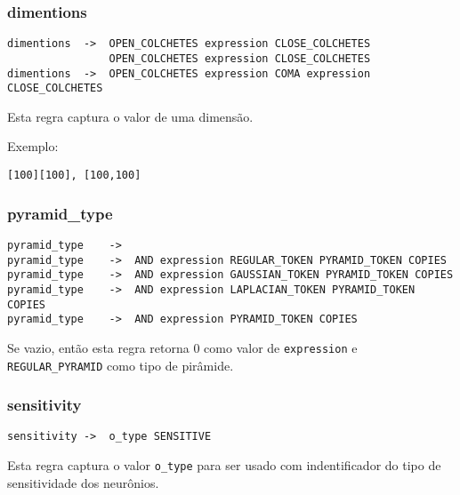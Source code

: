 \documentclass[a4paper,10pt]{article}
\begin{document}

	\subsubsection{dimentions}
		\begin{lstlisting}
dimentions	->	OPEN_COLCHETES expression CLOSE_COLCHETES
				OPEN_COLCHETES expression CLOSE_COLCHETES
dimentions	->	OPEN_COLCHETES expression COMA expression CLOSE_COLCHETES
		\end{lstlisting}

Esta regra captura o valor de uma dimens\~ao.

Exemplo:
\begin{lstlisting}
[100][100], [100,100]
\end{lstlisting}
\vspace{10mm}


	\subsubsection{pyramid\_type}
		\begin{lstlisting}
pyramid_type	->	
pyramid_type	->	AND expression REGULAR_TOKEN PYRAMID_TOKEN COPIES
pyramid_type	->	AND expression GAUSSIAN_TOKEN PYRAMID_TOKEN COPIES
pyramid_type	->	AND expression LAPLACIAN_TOKEN PYRAMID_TOKEN COPIES
pyramid_type	->	AND expression PYRAMID_TOKEN COPIES
		\end{lstlisting}

Se vazio, ent\~ao esta regra retorna 0 como valor de \texttt{expression} e \texttt{REGULAR\_PYRAMID} como tipo de pir\^amide.

\vspace{10mm}


	\subsubsection{sensitivity}
		\begin{lstlisting}
sensitivity	->	o_type SENSITIVE
		\end{lstlisting}

Esta regra captura o valor \texttt{o\_type} para ser usado com indentificador do tipo de sensitividade dos neur\^onios.
\end{document}
